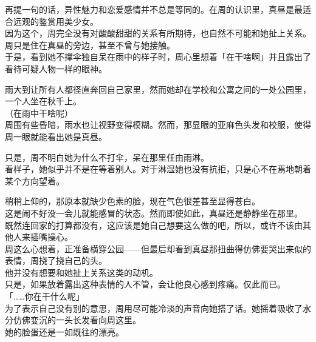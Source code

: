 再提一句的话，异性魅力和恋爱感情并不总是等同的。在周的认识里，真昼是最适合远观的鉴赏用美少女。\\

因为这个，周完全没有对酸酸甜甜的关系有所期待，也自然不可能和她扯上关系。周只是住在真昼的旁边，甚至不曾与她接触。\\

于是，看到她不撑伞独自呆在雨中的样子时，周心里想着「在干啥啊」并且露出了看待可疑人物一样的眼神。\\

\vspace{2\baselineskip}

雨大到让所有人都径直奔回自己家里，然而她却在学校和公寓之间的一处公园里，一个人坐在秋千上。\\

（在雨中干啥呢）\\

周围有些昏暗，雨水也让视野变得模糊。然而，那显眼的亚麻色头发和校服，使得周一眼就能看出她是真昼。

只是，周不明白她为什么不打伞，呆在那里任由雨淋。\\

看样子，她似乎并不是在等着别人。对于淋湿她也没有抗拒，只是心不在焉地朝着某个方向望着。

稍稍上仰的，那原本就缺少色素的脸，现在气色很差甚至显得苍白。\\

这是闹不好没一会儿就能感冒的状态。然而即使如此，真昼还是静静坐在那里。\\

既然连回家的打算都没有，这应该是她自己想要这么做的吧，所以，或许不该由其他人来插嘴操心。\\

周这么心想着，正准备横穿公园——但最后却看到真昼那扭曲得仿佛要哭出来似的表情，周挠了挠自己的头。\\

他并没有想要和她扯上关系这类的动机。\\

只是，如果放着露出这种表情的人不管，会让他良心感到疼痛。仅此而已。\\

「……你在干什么呢」\\

为了表示自己没有别的意思，周用尽可能冷淡的声音向她搭了话。她摇着吸收了水分仿佛变沉的一头长发看向周这里。\\

她的脸蛋还是一如既往的漂亮。

